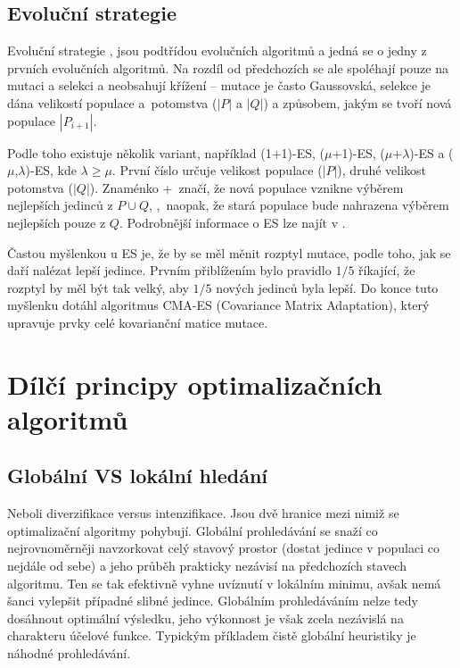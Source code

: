 \subsection{Evoluční strategie}

Evoluční strategie \cite{ES comprehensive},\cite{GO ebook} jsou podtřídou evolučních algoritmů a jedná se o jedny z prvních evolučních algoritmů. Na rozdíl od předchozích se ale spoléhají pouze na mutaci a selekci a neobsahují křížení -- mutace je často Gaussovská, selekce je dána velikostí populace a~potomstva ($|P|$ a $|Q|$) a způsobem, jakým se tvoří nová populace $|P_{i+1}|$.

Podle toho existuje několik variant, například (1+1)-ES, ($\mu$+1)-ES, ($\mu$+$\lambda$)-ES a ($\mu$,$\lambda$)-ES, kde $\lambda \geq \mu$. První číslo určuje velikost populace ($|P|$), druhé velikost potomstva ($|Q|$). Znaménko \bq +\eq   ~značí, že nová populace vznikne výběrem nejlepších jedinců z $P\cup Q$, \bq ,\eq ~naopak, že stará populace bude nahrazena výběrem nejlepších pouze z $Q$. Podrobnější informace o ES lze najít v \cite{ES comprehensive}.

Častou myšlenkou u ES je, že by se měl měnit rozptyl mutace, podle toho, jak se daří nalézat lepší jedince. Prvním přiblížením bylo pravidlo $1/5$ říkající, že rozptyl by měl být tak velký, aby $1/5$ nových jedinců byla lepší. Do konce tuto myšlenku dotáhl algoritmus CMA-ES \cite{Hansen CMAES} (Covariance Matrix Adaptation), který upravuje prvky celé kovarianční matice mutace.

\section{Dílčí principy optimalizačních algoritmů}\label{myslenky GO}

\subsection{Globální VS lokální hledání}

Neboli diverzifikace versus intenzifikace. Jsou dvě hranice mezi nimiž se optimalizační algoritmy pohybují. Globální prohledávání se snaží co nejrovnoměrněji navzorkovat celý stavový prostor (dostat jedince v populaci co nejdále od sebe) a jeho průběh prakticky nezávisí na předchozích stavech algoritmu. Ten se tak efektivně vyhne uvíznutí v lokálním minimu, avšak nemá šanci vylepšit případné slibné jedince. Globálním prohledáváním nelze tedy dosáhnout optimální výsledku, jeho výkonnost je však zcela nezávislá na charakteru účelové funkce. Typickým příkladem čistě globální heuristiky je náhodné prohledávání.

